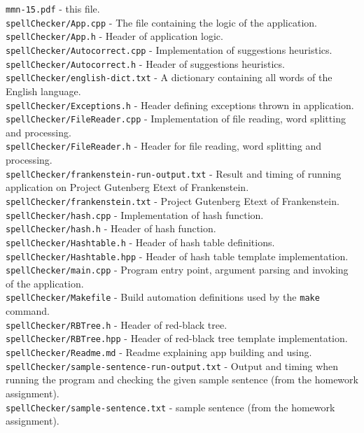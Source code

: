 \documentclass[a4paper]{article}
\begin{document}
\texttt{mmn-15.pdf} - this file.\\
\texttt{spellChecker/App.cpp} - The file containing the logic of the application.\\
\texttt{spellChecker/App.h} - Header of application logic.\\
\texttt{spellChecker/Autocorrect.cpp} - Implementation of suggestions heuristics.\\
\texttt{spellChecker/Autocorrect.h} - Header of suggestions heuristics.\\
\texttt{spellChecker/english-dict.txt} - A dictionary containing all words of the English language.\\
\texttt{spellChecker/Exceptions.h} - Header defining exceptions thrown in application.\\
\texttt{spellChecker/FileReader.cpp} - Implementation of file reading, word splitting and processing.\\
\texttt{spellChecker/FileReader.h} - Header for file reading, word splitting and processing.\\
\texttt{spellChecker/frankenstein-run-output.txt} - Result and timing of running application on Project Gutenberg Etext of Frankenstein.\\
\texttt{spellChecker/frankenstein.txt} - Project Gutenberg Etext of Frankenstein.\\
\texttt{spellChecker/hash.cpp} - Implementation of hash function.\\
\texttt{spellChecker/hash.h} - Header of hash function.\\
\texttt{spellChecker/Hashtable.h} - Header of hash table definitions.\\
\texttt{spellChecker/Hashtable.hpp} - Header of hash table template implementation.\\
\texttt{spellChecker/main.cpp} - Program entry point, argument parsing and invoking of the application.\\
\texttt{spellChecker/Makefile} - Build automation definitions used by the \texttt{make} command.\\
\texttt{spellChecker/RBTree.h} - Header of red-black tree.\\
\texttt{spellChecker/RBTree.hpp} - Header of red-black tree template implementation.\\
\texttt{spellChecker/Readme.md} - Readme explaining app building and using.\\
\texttt{spellChecker/sample-sentence-run-output.txt} - Output and timing when running the program and checking the given sample sentence (from the homework assignment).\\
\texttt{spellChecker/sample-sentence.txt} - sample sentence (from the homework assignment).\\
\end{document}
